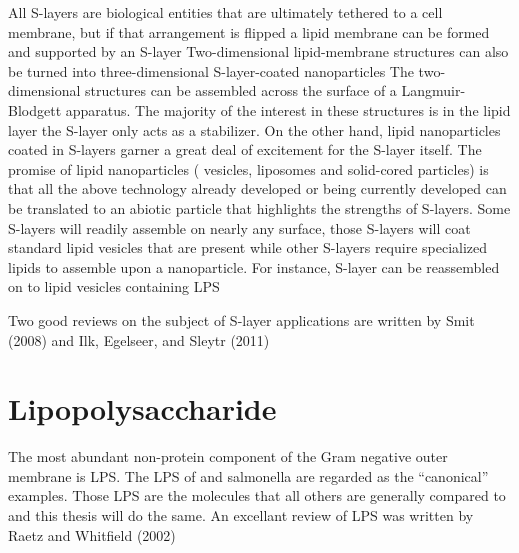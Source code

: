   All \acp{S-layer} are biological entities that are ultimately tethered to a cell membrane, but if that arrangement is flipped a lipid membrane can be formed and supported by an \ac{S-layer} Two-dimensional lipid-membrane structures can also be turned into three-dimensional \ac{S-layer}-coated nanoparticles The two-dimensional structures can be assembled across the surface of a Langmuir-Blodgett apparatus. The majority of the interest in these structures is in the lipid layer the \ac{S-layer} only acts as a stabilizer. On the other hand, lipid nanoparticles coated in \acp{S-layer} garner a great deal of excitement for the \ac{S-layer} itself. The promise of lipid nanoparticles (\ie{} vesicles, liposomes and solid-cored particles) is that all the above technology already developed or being currently developed can be translated to an abiotic particle that highlights the strengths of \acp{S-layer}. Some \acp{S-layer} will readily assemble on nearly any surface, those \acp{S-layer} will coat standard lipid vesicles that are present while other \acp{S-layer} require specialized lipids to assemble upon a nanoparticle. For instance, \caulobacter \ac{S-layer} can be reassembled on to lipid vesicles containing \caulobacter{} \ac{LPS} 
  
  Two good reviews on the subject of \ac{S-layer} applications are written by Smit (2008) and Ilk, Egelseer, and Sleytr (2011)

\section{Lipopolysaccharide}\label{sec:intro-lps}
The most abundant non-protein  component of the Gram negative outer membrane is
\ac{LPS}. The \ac{LPS} of \ecoli and \ac{salmonella} are regarded as the
``canonical'' examples. Those \ac{LPS} are the molecules that all others are generally
compared to and this thesis will do the same. 
An excellant review of \ac{LPS} was written by Raetz and Whitfield
(2002)

